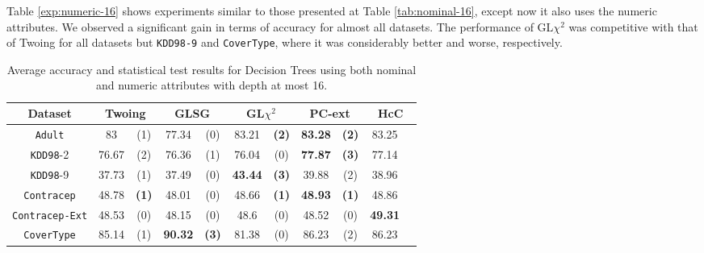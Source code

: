 Table \ref{exp:numeric-16}
shows experiments  similar to those presented at Table \ref{tab:nominal-16}, except now it also uses the numeric attributes.
We observed a significant gain in terms of accuracy for almost all datasets. 
The performance of GL$\chi^2$ was competitive with that of Twoing for all datasets but {\tt KDD98-9} and {\tt CoverType}, where it was
considerably better and worse, respectively.


\begin{table}
\small
\caption{Average accuracy and statistical test results for  Decision Trees using both nominal and numeric attributes with depth at most 16.}
\centering
\begin{tabular}{c|cc|cc|cc|cc|cc} 
Dataset              &        \multicolumn{2}{c|}{Twoing} &   \multicolumn{2}{c|}{GLSG} &   \multicolumn{2}{c|}{GL$\chi^2$} & \multicolumn{2}{c|}{PC-ext}  & \multicolumn{2}{c}{HcC}  \\  \hline   
{\tt Adult}          &  83            &  (1)              &  77.34      &  (0)          &  83.21       &  {\bf (2)}         & {\bf 83.28} & {\bf (2)}     & 83.25 &  \\
{\tt KDD98}-2        &  76.67         &  (2)              &  76.36      &  (1)          &  76.04       &  (0)               & {\bf 77.87} & {\bf (3)}     & 77.14 &  \\
{\tt KDD98}-9        &  37.73         &  (1)              &  37.49      &  (0)          &  {\bf 43.44} &  {\bf (3)}         &  39.88      & (2)           & 38.96  &   \\
{\tt Contracep}      &  48.78         &  {\bf (1)}        &  48.01      &  (0)          &  48.66       &  {\bf (1)}         & {\bf 48.93} & {\bf (1)}     & 48.86  &   \\
{\tt Contracep-Ext}  &  48.53         &  (0)              &  48.15      &  (0)          &  48.6        &  (0)               &  48.52      & (0)           & {\bf 49.31 } &    \\
{\tt CoverType}      &  85.14         &  (1)              &  {\bf 90.32}&  {\bf (3)}    &  81.38       &  (0)               &  86.23      & (2)           & 86.23 &   \\

\end{tabular}
\end{table}
